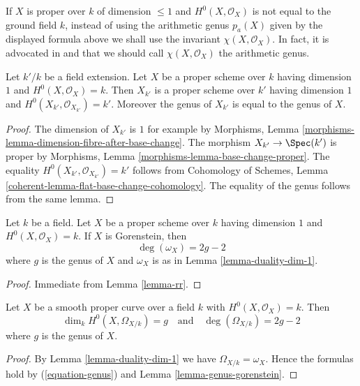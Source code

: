 \medskip\noindent
If $X$ is proper over $k$ of dimension $\leq 1$ and $H^0(X, \mathcal{O}_X)$
is not equal to the ground field $k$, instead of using the arithmetic genus
$p_a(X)$ given by the displayed formula above we shall use the invariant
$\chi(X, \mathcal{O}_X)$. In fact, it is advocated in
\cite[page 276]{FAC} and \cite[Introduction]{Hirzebruch}
that we should call $\chi(X, \mathcal{O}_X)$ the arithmetic genus.

\begin{lemma}
\label{lemma-genus-base-change}
Let $k'/k$ be a field extension. Let $X$ be a proper scheme over $k$ having
dimension $1$ and $H^0(X, \mathcal{O}_X) = k$. Then $X_{k'}$ is a
proper scheme over $k'$
having dimension $1$ and $H^0(X_{k'}, \mathcal{O}_{X_{k'}}) = k'$.
Moreover the genus of $X_{k'}$ is equal to the genus of $X$.
\end{lemma}

\begin{proof}
The dimension of $X_{k'}$ is $1$ for example by
Morphisms, Lemma \ref{morphisms-lemma-dimension-fibre-after-base-change}.
The morphism $X_{k'} \to \Spec(k')$ is proper by
Morphisms, Lemma \ref{morphisms-lemma-base-change-proper}.
The equality $H^0(X_{k'}, \mathcal{O}_{X_{k'}}) = k'$ follows from
Cohomology of Schemes, Lemma
\ref{coherent-lemma-flat-base-change-cohomology}.
The equality of the genus follows from the same lemma.
\end{proof}

\begin{lemma}
\label{lemma-genus-gorenstein}
Let $k$ be a field. Let $X$ be a proper scheme over $k$ having
dimension $1$ and $H^0(X, \mathcal{O}_X) = k$. If $X$ is Gorenstein,
then
$$
\deg(\omega_X) = 2g - 2
$$
where $g$ is the genus of $X$ and $\omega_X$ is as in
Lemma \ref{lemma-duality-dim-1}.
\end{lemma}

\begin{proof}
Immediate from Lemma \ref{lemma-rr}.
\end{proof}

\begin{lemma}
\label{lemma-genus-smooth}
Let $X$ be a smooth proper curve over a field $k$
with $H^0(X, \mathcal{O}_X) = k$. Then
$$
\dim_k H^0(X, \Omega_{X/k}) = g
\quad\text{and}\quad
\deg(\Omega_{X/k}) = 2g - 2
$$
where $g$ is the genus of $X$.
\end{lemma}

\begin{proof}
By Lemma \ref{lemma-duality-dim-1} we have $\Omega_{X/k} = \omega_X$.
Hence the formulas hold by (\ref{equation-genus}) and
Lemma \ref{lemma-genus-gorenstein}.
\end{proof}







